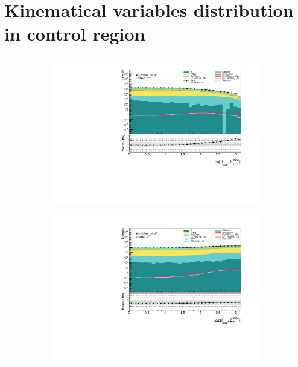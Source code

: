 \documentclass[12pt, a4paper]{book}
\begin{document}
\chapter{Kinematical variables distribution in control region}\label{apendix:Kin_var_in_CR}
\graphicspath{{../../Plots/Data_Analysis/SRs/Control_region/}} 
\begin{figure}[!ht]
    \centering
    \begin{subfigure}[b]{0.49\textwidth}
        \centering
        \includegraphics[width=\textwidth]{dPhiCloseMet.pdf}
    \end{subfigure}
    \hfill
    \begin{subfigure}[b]{0.49\textwidth}
        \centering
        \includegraphics[width=\textwidth]{dPhiLeadMet.pdf}
    \end{subfigure}

\end{figure}
\end{document}
